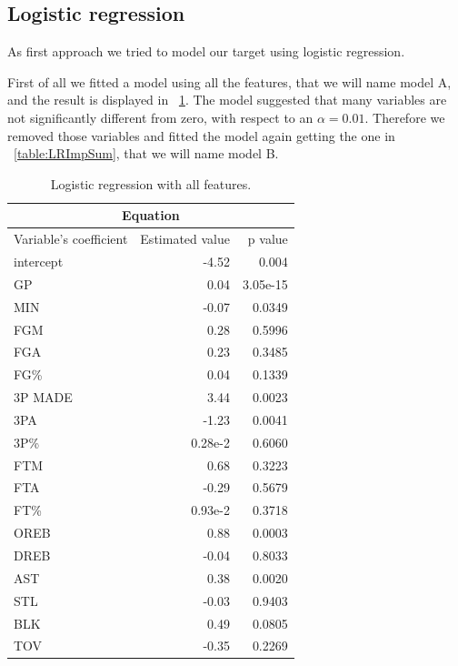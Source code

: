 \subsection{Logistic regression}

As first approach we tried to model our target using logistic regression.

First of all we fitted a model using all the features, that we will name model A, and the result is displayed in \Tab~\ref{table:LRAllSum}. The model suggested that many variables are not significantly different from zero, with respect to an $\alpha = 0.01$. Therefore we removed those variables and fitted the model again getting the one in \Tab~\ref{table:LRImpSum}, that we will name model B.

\begin{table}[H]
	\begin{subtable}[h]{0.3\textwidth}
		\centering
		\begin{tabular}{|| l | r | r ||} 
			\hline
			\multicolumn{3}{|c|}{Equation} \\
			\hline
			Variable's coefficient & Estimated value & p value \\
			\hline
			intercept & -4.52 & 0.004 \\
			GP & 0.04 & 3.05e-15 \\
			MIN & -0.07 & 0.0349 \\
			FGM & 0.28 & 0.5996 \\
			FGA & 0.23 & 0.3485 \\
			FG\% & 0.04 & 0.1339 \\
			3P MADE & 3.44 & 0.0023 \\
			3PA & -1.23 & 0.0041 \\
			3P\% & 0.28e-2 & 0.6060 \\
			FTM & 0.68 & 0.3223 \\
			FTA & -0.29 & 0.5679 \\
			FT\% & 0.93e-2 & 0.3718 \\
			OREB & 0.88 & 0.0003 \\
			DREB & -0.04 & 0.8033 \\
			AST & 0.38 & 0.0020 \\
			STL & -0.03 & 0.9403 \\
			BLK & 0.49 & 0.0805 \\				
			TOV & -0.35 & 0.2269 \\		
			\hline
		\end{tabular}
		\caption{Logistic regression with all features.}
		\label{table:LRAllSum}
	\end{subtable}

\end{table}
